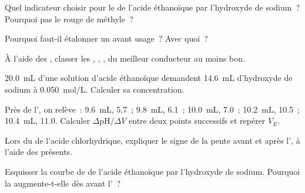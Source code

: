 \begin{exercise}[$\star$]\label{exo:g12:ph-conductivity-titrations:3}
Quel indicateur choisir pour le  de l'acide éthanoïque par
l'hydroxyde de sodium~? Pourquoi pas le rouge de méthyle~?
\end{exercise}

\begin{exercise}[$\star$]\label{exo:g12:ph-conductivity-titrations:4}
Pourquoi faut-il étalonner un  avant usage~? Avec quoi~?
\end{exercise}

\begin{exercise}[$\star$]\label{exo:g12:ph-conductivity-titrations:5}
À l'aide des , classer les 
, ,
,  du meilleur conducteur au moins bon.
\end{exercise}

\begin{exercise}[$\star\star$]\label{exo:g12:ph-conductivity-titrations:6}
\qty{20.0}{mL} d'une solution d'acide éthanoïque demandent
\qty{14.6}{mL} d'hydroxyde de sodium à \qty{0.050}{mol/L}. Calculer sa
concentration.
\end{exercise}

\begin{exercise}[$\star\star$]\label{exo:g12:ph-conductivity-titrations:7}
Près de l', on relève~: \qty{9.6}{mL},  5.7~;
\qty{9.8}{mL}, 6.1~; \qty{10.0}{mL}, 7.0~; \qty{10.2}{mL}, 10.5~;
\qty{10.4}{mL}, 11.0. Calculer $\Delta\mathrm{pH}/\Delta V$ entre deux
points successifs et repérer $V_E$.
\end{exercise}

\begin{exercise}[$\star\star$]\label{exo:g12:ph-conductivity-titrations:8}
Lors du  de l'acide chlorhydrique, expliquer le
signe de la pente avant et après l', à l'aide des 
présents.
\end{exercise}

\begin{exercise}[$\star\star$]\label{exo:g12:ph-conductivity-titrations:9}
Esquisser la courbe de  de l'acide éthanoïque
par l'hydroxyde de sodium. Pourquoi la  augmente-t-elle dès
avant l'~?
\end{exercise}

